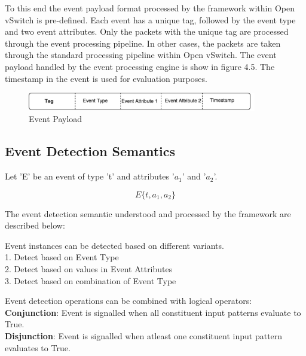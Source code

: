 To this end the event payload format processed by the framework within Open vSwitch is pre-defined. Each event has a unique tag,  followed by the event type and two event attributes. Only the packets with the unique tag are processed through the event processing pipeline. In other cases, the packets are taken through the standard processing pipeline within Open vSwitch. The event payload handled by the event processing engine is show in figure 4.5. The timestamp in the event is used for evaluation purposes.

\begin{figure}[H]
	\centering
	\caption{Event Payload}
	\includegraphics[width=10cm]{payload.pdf}
\end{figure}

\subsection{Event Detection Semantics}
Let 'E' be an event of type 't' and attributes '$a_1$' and '$a_2$'.

\begin{equation}
E\lbrace t,a_1,a_2 \rbrace
\end{equation}

The event detection semantic understood and processed by the framework are described below:

\begin{flushleft}
	Event instances can be detected based on different variants.
	\\1. Detect based on Event Type
	\\2. Detect based on values in Event Attributes
	\\3. Detect based on combination of Event Type
	\\
\end{flushleft}
\begin{flushleft}
	Event detection operations can be combined with logical operators:
	\\
	\textbf{Conjunction}: Event is signalled when all constituent input patterns evaluate to True. 
	\\
	\textbf{Disjunction}: Event is signalled when atleast one constituent input pattern evaluates to True.
	\\

\end{flushleft}


